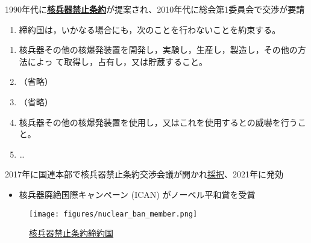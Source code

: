 \documentclass[
  xelatex,
  ja=standard]{bxjsarticle}
\providecommand{\tightlist}{%
  \setlength{\itemsep}{0pt}\setlength{\parskip}{0pt}}\usepackage{longtable,booktabs,array}
\begin{document}
1990年代に\href{https://www.mofa.go.jp/mofaj/dns/ac_d/page23_002807.html}{\textbf{核兵器禁止条約}}が提案され、2010年代に総会第1委員会で交渉が要請

\begin{tcolorbox}[enhanced jigsaw, opacityback=0, bottomtitle=1mm, arc=.35mm, opacitybacktitle=0.6, title=\textcolor{quarto-callout-note-color}{\faInfo}\hspace{0.5em}{\href{https://www.mofa.go.jp/mofaj/dns/ac_d/page23_002807.html}{\textbf{核兵器禁止条約}}　第1条}, bottomrule=.15mm, coltitle=black, toptitle=1mm, titlerule=0mm, leftrule=.75mm, colframe=quarto-callout-note-color-frame, breakable, left=2mm, rightrule=.15mm, toprule=.15mm, colbacktitle=quarto-callout-note-color!10!white, colback=white]

\begin{enumerate}
\def\labelenumi{\arabic{enumi}.}
\tightlist
\item
  締約国は，いかなる場合にも，次のことを行わないことを約束する。
\end{enumerate}

\begin{enumerate}
\def\labelenumi{\alph{enumi}.}
\tightlist
\item
  核兵器その他の核爆発装置を開発し，実験し，生産し，製造し，その他の方法によっ
  て取得し，占有し，又は貯蔵すること。
\item
  （省略）
\item
  （省略）
\item
  核兵器その他の核爆発装置を使用し，又はこれを使用するとの威嚇を行うこと。
\item
  \ldots{}
\end{enumerate}

\end{tcolorbox}

2017年に国連本部で核兵器禁止条約交渉会議が開かれ\href{https://www.mofa.go.jp/mofaj/files/000433139.pdf}{採択}、2021年に発効

\begin{itemize}
\tightlist
\item
  核兵器廃絶国際キャンペーン (ICAN) がノーベル平和賞を受賞
\end{itemize}

\begin{figure}[htpb]

{\centering \texttt{[image: figures/nuclear\_ban\_member.png]}

}

\caption{\href{https://commons.wikimedia.org/wiki/File:Treaty_on_the_Prohibition_of_Nuclear_Weapons_members.svg}{核兵器禁止条約締約国}}

\end{figure}
\end{document}
